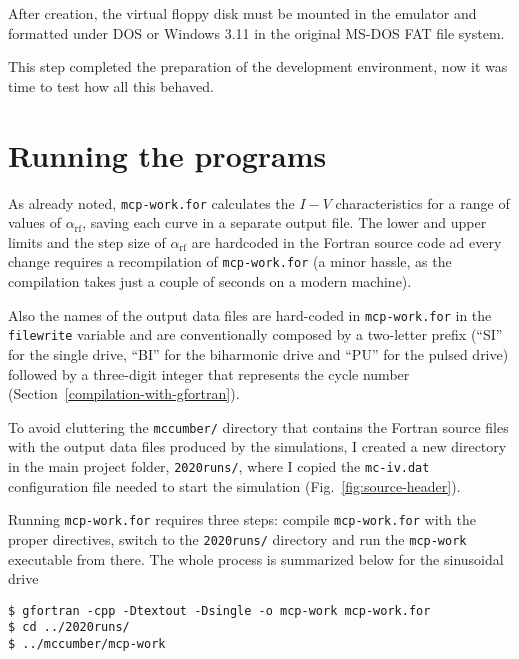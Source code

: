 After creation, the virtual floppy disk must be mounted in the emulator and formatted under DOS or Windows 3.11 in the original MS-DOS FAT file system.

This step completed the preparation of the development environment, now it was time to test how all this behaved.



\section{Running the programs}

As already noted, \texttt{mcp-work.for} calculates the $I - V$ characteristics for a range of values of $\alpha_\mathrm{rf}$, saving each curve in a separate output file. 
The lower and upper limits and the step size of $\alpha_\mathrm{rf}$ are hardcoded in the Fortran source code ad every change requires a recompilation of \texttt{mcp-work.for} (a minor hassle, as the compilation takes just a couple of seconds on a modern machine).

Also the names of the output data files are hard-coded in \texttt{mcp-work.for} in the \texttt{filewrite} variable and are conventionally composed by a two-letter prefix (``SI'' for the single drive, ``BI'' for the biharmonic drive and ``PU'' for the pulsed drive) followed by a three-digit integer that represents the cycle number (Section~\ref{compilation-with-gfortran}).

To avoid cluttering the \texttt{mccumber/} directory that contains the Fortran source files with the output data files produced by the simulations, I created  a new directory in the main project folder, \texttt{2020runs/}, where I copied the \texttt{mc-iv.dat} configuration file needed to start the simulation (Fig.~\ref{fig:source-header}).

Running \texttt{mcp-work.for} requires three steps: compile \texttt{mcp-work.for} with the proper directives, switch to the \texttt{2020runs/} directory and run the \texttt{mcp-work} executable from there. The whole process is summarized below for the sinusoidal drive

\begin{lstlisting}
$ gfortran -cpp -Dtextout -Dsingle -o mcp-work mcp-work.for
$ cd ../2020runs/
$ ../mccumber/mcp-work
\end{lstlisting}


